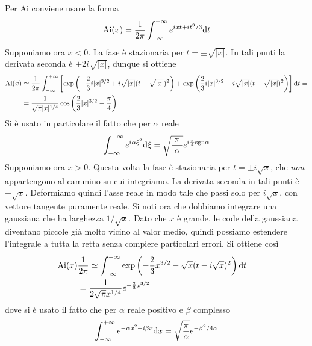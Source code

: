 \documentclass[11 pt]{article}
\newcommand{\ai}{\mathrm{Ai}}
\begin{document}
	Per $\ai$ conviene usare la forma
	\[\ai(x)=\frac{1}{2\pi}\int_{-\infty}^{+\infty}e^{ixt+it^3/3}\d t\]
	Supponiamo ora $x<0$. La fase è stazionaria per	$t=\pm\sqrt{|x|}$. In tali punti la derivata seconda è $\pm2i\sqrt{|x|}$, dunque si ottiene
	\begin{align*}
		\ai(x)&\simeq\frac{1}{2\pi}\int_{-\infty}^{+\infty}\left[\exp\left(-\frac{2}{3}i|x|^{3/2}+i\sqrt{|x|}(t-\sqrt{|x|})^2\right)+\exp\left(\frac{2}{3}i|x|^{3/2}-i\sqrt{|x|}(t-\sqrt{|x|})^2\right)\right]\d t=\\&=\frac{1}{\sqrt{\pi}|x|^{1/4}}\cos\left(\frac{2}{3}|x|^{3/2}-\frac{\pi}{4}\right)
	\end{align*}
	Si è usato in particolare il fatto che per $\alpha$ reale
	\[\int_{-\infty}^{+\infty}e^{i\alpha \xi^2}\mathrm{d} \xi=\sqrt{\frac{\pi}{|\alpha|}}e^{i\frac{\pi}{4}\textrm{sgn}\alpha}\]
	Supponiamo ora $x>0$. Questa volta la fase è stazionaria per $t=\pm i\sqrt{x}$, che \textit{non} appartengono al cammino su cui integriamo. La derivata seconda in tali punti è $\mp\sqrt{x}$. Deformiamo quindi l'asse reale in modo tale che passi solo per $i\sqrt{x}$, con vettore tangente puramente reale. Si noti ora che dobbiamo integrare una gaussiana che ha larghezza $1/\sqrt{x}$. Dato che $x$ è grande, le code della gaussiana diventano piccole già molto vicino al valor medio, quindi possiamo estendere l'integrale a tutta la retta senza compiere particolari errori. Si ottiene così
	\begin{align*}
		\ai(x)&\frac{1}{2\pi}\simeq\int_{-\infty}^{+\infty}\exp\left(-\frac{2}{3}x^{3/2}-\sqrt{x}(t-i\sqrt{x})^2\right)\d t=\\&=\frac{1}{2\sqrt{\pi}x^{1/4}}e^{-\frac{2}{3}x^{3/2}}	
	\end{align*}
	dove si è usato il fatto che per $\alpha$ reale positivo e $\beta$ complesso
	\[\int_{-\infty}^{+\infty}e^{-\alpha x^2+i\beta x}\mathrm{d} x=\sqrt{\frac{\pi}{\alpha}}e^{-\beta^2/4\alpha}\]
	
\end{document}
